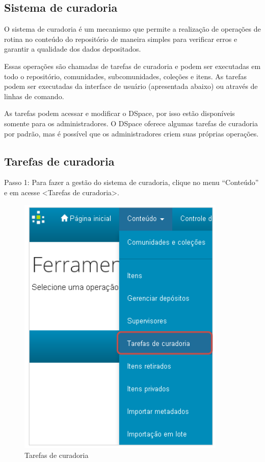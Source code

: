 \documentclass[12pt,hidelinks]{article}
\begin{document}
    \subsection{Sistema de curadoria}
    
    O sistema de curadoria é um mecanismo que permite a realização de operações de rotina no conteúdo do repositório de maneira simples para verificar erros e garantir a qualidade dos dados depositados. 
    
    \singlespacing
    
    Essas operações são chamadas de tarefas de curadoria e podem ser executadas em todo o repositório, comunidades, subcomunidades, coleções e itens. As tarefas podem ser executadas da interface de usuário (apresentada abaixo) ou através de linhas de comando.
    
    \singlespacing
    
    As tarefas podem acessar e modificar o DSpace, por isso estão disponíveis somente para os administradores. O DSpace oferece algumas tarefas de curadoria por padrão, mas é possível que os administradores criem suas próprias operações.
    
    \subsection{Tarefas de curadoria}
    
    Passo 1: Para fazer a gestão do sistema de curadoria, clique no menu “Conteúdo” e em acesse <Tarefas de curadoria>.
    
    \begin{figure}[!htp]
                \centering
                \includegraphics[scale=0.6]{figura/Figura119.png}
                \caption{Tarefas de curadoria}
            \label{Rotulo}
        \end{figure}
\end{document}
